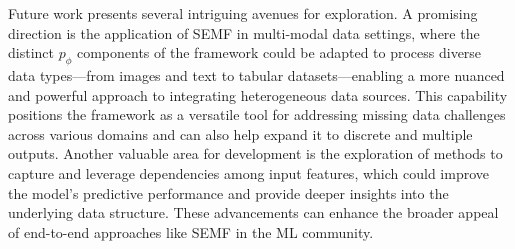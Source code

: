 \documentclass{article}
\begin{document}
\label{future_work}
Future work presents several intriguing avenues for exploration. A promising direction is the application of SEMF in multi-modal data settings, where the distinct $p_\phi$ components of the framework could be adapted to process diverse data types—from images and text to tabular datasets—enabling a more nuanced and powerful approach to integrating heterogeneous data sources. This capability positions the framework as a versatile tool for addressing missing data challenges across various domains and can also help expand it to discrete and multiple outputs. Another valuable area for development is the exploration of methods to capture and leverage dependencies among input features, which could improve the model's predictive performance and provide deeper insights into the underlying data structure. These advancements can enhance the broader appeal of end-to-end approaches like SEMF in the ML community.


\end{document}
